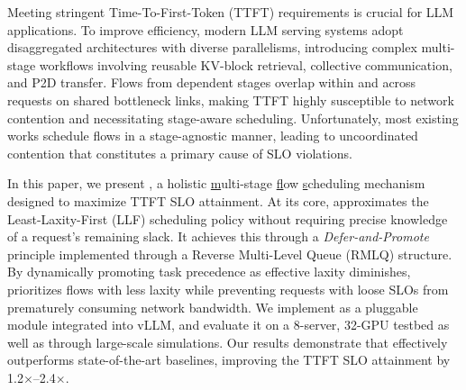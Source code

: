 Meeting stringent Time-To-First-Token (TTFT) requirements is crucial for LLM applications. To improve efficiency, modern LLM serving systems adopt disaggregated architectures with diverse parallelisms, introducing complex multi-stage workflows involving reusable KV-block retrieval, collective communication, and P2D transfer. Flows from dependent stages overlap within and across requests on shared bottleneck links, making TTFT highly susceptible to network contention and necessitating stage-aware scheduling. Unfortunately, most existing works schedule flows in a stage-agnostic manner, leading to uncoordinated contention that constitutes a primary cause of SLO violations.

In this paper, we present \sys, a holistic \underline{m}ulti-stage \underline{f}low \underline{s}cheduling mechanism designed to maximize TTFT SLO attainment. At its core, \sys approximates the Least-Laxity-First (LLF) scheduling policy without requiring precise knowledge of a request's remaining slack. It achieves this through a \emph{Defer-and-Promote} principle implemented through a Reverse Multi-Level Queue (RMLQ) structure. By dynamically promoting task precedence as effective laxity diminishes, \sys prioritizes flows with less laxity while preventing requests with loose SLOs from prematurely consuming network bandwidth. We implement \sys as a pluggable module integrated into vLLM, and evaluate it on a 8-server, 32-GPU testbed as well as through large-scale simulations. Our results demonstrate that \sys effectively outperforms state-of-the-art baselines, improving the TTFT SLO attainment by 1.2$\times$--2.4$\times$.

